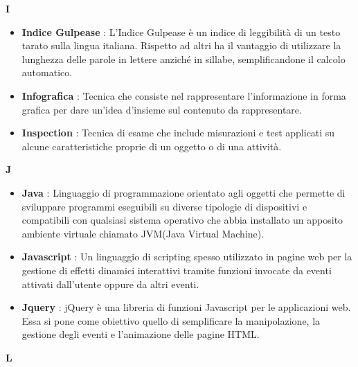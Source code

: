 \newpage
{\huge \textbf{I}}
\begin{flushleft}
\begin{itemize}[label={}]
\item \textbf{Indice Gulpease} : L'Indice Gulpease è un indice di leggibilità di un testo tarato sulla lingua italiana. Rispetto ad altri ha il vantaggio di utilizzare la lunghezza delle parole in lettere anziché in sillabe, semplificandone il calcolo automatico.
\item \textbf{Infografica} : Tecnica che consiste nel rappresentare l'informazione in forma grafica per dare un'idea d'insieme sul contenuto da rappresentare.
\item \textbf{Inspection} :  Tecnica di esame che include misurazioni e test applicati su alcune caratteristiche proprie di un oggetto o di una attività.
\end{itemize}
\end{flushleft}
\newpage
{\huge \textbf{J}}
\begin{flushleft}
\begin{itemize}[label={}]
\item \textbf{Java} : Linguaggio di programmazione orientato agli oggetti che permette di sviluppare programmi eseguibili su diverse tipologie di dispositivi e compatibili con qualsiasi sistema operativo che abbia installato un apposito ambiente virtuale chiamato JVM(Java Virtual Machine).
\item \textbf{Javascript} : Un linguaggio di scripting spesso utilizzato in pagine web per la gestione di effetti dinamici interattivi tramite funzioni invocate da eventi attivati dall'utente oppure da altri eventi.
\item \textbf{Jquery} : jQuery è una libreria di funzioni Javascript per le applicazioni web. Essa si pone come obiettivo quello di semplificare la manipolazione, la gestione degli eventi e l'animazione delle pagine HTML.
\end{itemize}
\end{flushleft}
\newpage
{\huge \textbf{L}}
